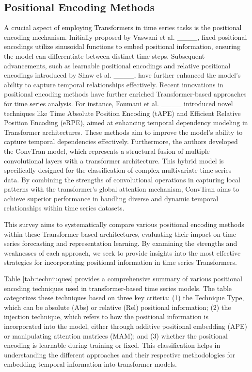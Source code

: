 \subsection{Positional Encoding Methods}
A crucial aspect of employing Transformers in time series tasks is the positional encoding mechanism. Initially proposed by Vaswani et al. ____, fixed positional encodings utilize sinusoidal functions to embed positional information, ensuring the model can differentiate between distinct time steps. Subsequent advancements, such as learnable positional encodings and relative positional encodings introduced by Shaw et al. ____, have further enhanced the model's ability to capture temporal relationships effectively. Recent innovations in positional encoding methods have further enriched Transformer-based approaches for time series analysis.
For instance, Foumani et al. ____ introduced novel techniques like Time Absolute Position Encoding (tAPE) and Efficient Relative Position Encoding (eRPE), aimed at enhancing temporal dependency modeling in Transformer architectures. These methods aim to improve the model's ability to capture temporal dependencies effectively.
Furthermore, the authors developed the ConvTran model, which represents a structural fusion of multiple convolutional layers with a transformer architecture. This hybrid model is specifically designed for the classification of complex multivariate time series data. By combining the strengths of convolutional operations in capturing local patterns with the transformer's global attention mechanism, ConvTran aims to achieve superior performance in handling diverse and dynamic temporal relationships within time series datasets.

This survey aims to systematically compare various positional encoding methods within these Transformer-based architectures, evaluating their impact on time series forecasting and representation learning. By examining the strengths and weaknesses of each approach, we seek to provide insights into the most effective strategies for incorporating positional information in time series Transformers.
 
Table \ref{tab:techniuques} provides a comprehensive summary of various positional encoding techniques used in transformer-based time series models. The table categorizes these techniques based on three key criteria: (1) the Technique Type, which can be absolute (Abs) or relative (Rel) positional information; (2) the injection technique, which refers to how the positional information is incorporated into the model, either through additive positional embedding (APE) or manipulating attention matrices (MAM); and (3) whether the positional encoding is learnable during training or fixed. This classification helps in understanding the different approaches and their respective methodologies for embedding temporal information into transformer models.






